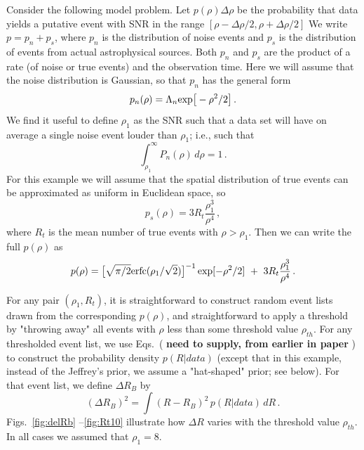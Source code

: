 \documentclass[aps,prd]{revtex4-1}
\newcommand{\curt}[1]{{\color{magenta} \bf #1}}
\newcommand{\be}{\begin{equation}}
\newcommand{\ee}{\end{equation}}
\begin{document}
Consider the following model problem.
Let $p(\rho)\Delta\rho$ be the probability that data yields a putative event with SNR in the
range $[\rho - \Delta\rho/2, \rho + \Delta\rho/2]$  We write $p = p_n + p_s$, where $p_n$ is
the distribution of noise events and $p_s$ is the distribution of events from actual astrophysical sources.   Both $p_n$ and $p_s$ are the product of a rate (of noise or true events) and the observation time.  Here we will assume that the noise distribution is Gaussian, so that $p_n$
has the general form
\be 
p_n(\rho) = \Lambda_n {\rm exp}\big[-\rho^2/2\big] \, .
\ee
\noindent
We find it useful to define $\rho_1$ as the SNR such that a data set will have on average
a single noise event louder than $\rho_1$; i.e., such that
\be
\int_{\rho_1}^{\infty} P_n(\rho)\, d\rho  = 1 \, .
\ee
For this example we will assume that the spatial distribution of true events can be approximated as uniform in Euclidean space, so 
\be\label{eq:ps}
p_s(\rho) = 3 R_t \frac{\rho_1^3}{\rho^4} \, ,
\ee
\noindent where $R_t$ is the mean number of true events with $\rho > \rho_1$.
Then we can write the full $p(\rho)$ as
\be\label{eq:ptot}
p(\rho) = \big[\sqrt{\pi/2} {\rm erfc}(\rho_1/\sqrt{2})\big]^{-1} \, {\rm exp}[-\rho^2/2]\  + \ 3 R_t \frac{\rho_1^3}{\rho^4} \, .
\ee


For any pair $(\rho_1, R_t)$, it is straightforward to construct random event lists drawn from the corresponding $p(\rho)$, and straightforward to apply a threshold by "throwing away" all events with $\rho$ less than some threshold value $\rho_{th}$.  For any thresholded event list, we use
Eqs.~(\curt{need to supply, from earlier in paper} ) to construct the probability density $p(R|data)$ (except that in this example, instead of the
Jeffrey's prior, we assume a "hat-shaped" prior; see below).
For that event list, we define $\Delta R_B$ by
\be
(\Delta R_B)^2 = \int{(R - R_B)^2 \, p(R|data)\, dR }\, .
\ee
%
Figs.~\ref{fig:delRb} --\ref{fig:Rt10}  illustrate how $\Delta R$ varies with the threshold value $\rho_{th}$.  In all cases we assumed that $\rho_1 = 8$.
%
\end{document}
